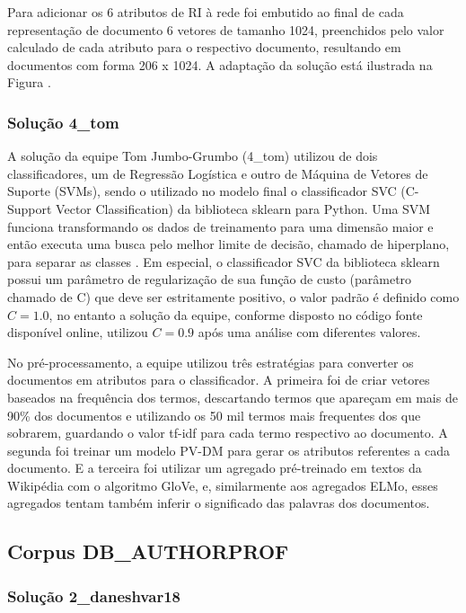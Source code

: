 				Para adicionar os 6 atributos de RI à rede foi embutido ao final de cada representação de documento 6 vetores de tamanho 1024, preenchidos pelo valor calculado de cada atributo para o respectivo documento, resultando em documentos com forma 206 x 1024.
				A adaptação da solução está ilustrada na Figura .

			\subsubsection{Solução 4\_tom}
				A solução da equipe Tom Jumbo-Grumbo (4\_tom) utilizou de dois classificadores, um de Regressão Logística e outro de Máquina de Vetores de Suporte (SVMs), sendo o utilizado no modelo final o classificador SVC (C-Support Vector Classification) da biblioteca sklearn para Python.
				Uma SVM funciona transformando os dados de treinamento para uma dimensão maior e então executa uma busca pelo melhor limite de decisão, chamado de hiperplano, para separar as classes \cite[p.~408]{Han:2011:DMC:1972541}.
				Em especial, o classificador SVC da biblioteca sklearn possui um parâmetro de regularização de sua função de custo (parâmetro chamado de C) que deve ser estritamente positivo, o valor padrão é definido como $C = 1.0$, no entanto a solução da equipe, conforme disposto no código fonte disponível online, utilizou $C = 0.9$ após uma análise com diferentes valores.

				No pré-processamento, a equipe utilizou três estratégias para converter os documentos em atributos para o classificador.
				A primeira foi de criar vetores baseados na frequência dos termos, descartando termos que apareçam em mais de 90\% dos documentos e utilizando os 50 mil termos mais frequentes dos que sobrarem, guardando o valor tf-idf para cada termo respectivo ao documento.
				A segunda foi treinar um modelo PV-DM para gerar os atributos referentes a cada documento.
				E a terceira foi utilizar um agregado pré-treinado em textos da Wikipédia com o algoritmo GloVe, e, similarmente aos agregados ELMo, esses agregados tentam também inferir o significado das palavras dos documentos.




		\subsection{Corpus DB\_AUTHORPROF}

			\subsubsection{Solução 2\_daneshvar18}

